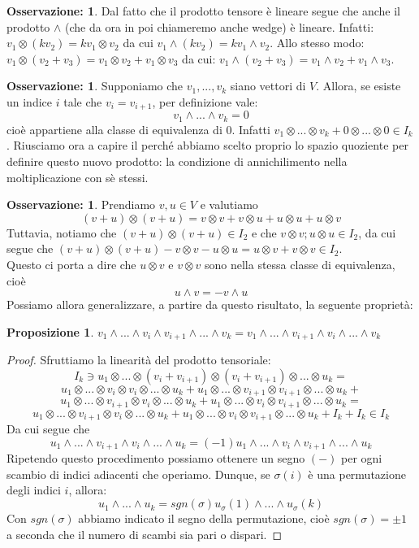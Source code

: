 \documentclass[12pt,a4paper]{report}
\theoremstyle{definition}
\theoremstyle{Theorem}
\newtheorem{Prop}[Def]{Proposizione}
\theoremstyle{definition}
\theoremstyle{definition}
\theoremstyle{definition}
\newtheorem{Obs}[Def]{Osservazione:}
\begin{document}
\begin{Obs}
	Dal fatto che il prodotto tensore è lineare segue che anche il prodotto $\wedge$ (che da ora in poi chiameremo anche wedge) è lineare. Infatti:
	$v_1\otimes (kv_2)=kv_1\otimes v_2$ da cui $v_1\wedge (kv_2)=kv_1\wedge v_2$.
	Allo stesso modo: $v_1\otimes (v_2+v_3)=v_1\otimes v_2+v_1\otimes v_3$ da cui: $v_1\wedge (v_2+v_3)=v_1\wedge v_2+v_1\wedge v_3$.
\end{Obs}
\begin{Obs}
	Supponiamo che $v_1,...,v_k$ siano vettori di $V$. Allora, se esiste un indice $i$ tale che $v_i=v_{i+1}$, per definizione vale:
	$$v_1\wedge...\wedge v_k=0$$ cioè appartiene alla classe di equivalenza di $0$. Infatti $v_1\otimes...\otimes v_k+0\otimes...\otimes 0\in I_k$. Riusciamo ora a capire il perché abbiamo scelto proprio lo spazio quoziente per definire questo nuovo prodotto: la condizione di annichilimento nella moltiplicazione con sè stessi. 
\end{Obs}
\begin{Obs}
	Prendiamo $v,u\in V$ e valutiamo
	$$(v+u)\otimes (v+u)=v\otimes v+v\otimes u + u \otimes u +u\otimes v$$
	Tuttavia, notiamo che $(v+u)\otimes (v+u)\in I_2$ e che $v\otimes v;u \otimes u\in I_2$, da cui segue che $(v+u)\otimes (v+u)-v\otimes v-u \otimes u=u\otimes v+v\otimes v\in I_2$.\\
	Questo ci porta a dire che $u\otimes v$ e $v\otimes v$ sono nella stessa classe di equivalenza, cioè $$u\wedge v=-v\wedge u$$
	Possiamo allora generalizzare, a partire da questo risultato, la seguente proprietà:
\end{Obs}
\begin{Prop}
	$v_1\wedge...\wedge v_i\wedge v_{i+1}\wedge...\wedge v_k=v_1\wedge...\wedge v_{i+1}\wedge v_{i}\wedge...\wedge v_k$
\end{Prop}
\begin{proof}
	Sfruttiamo la linearità del prodotto tensoriale:
	$$I_k\ni u_1\otimes...\otimes (v_i+v_{i+1})\otimes(v_i+v_{i+1})\otimes ...\otimes u_k=$$
	$$u_1\otimes...\otimes v_i\otimes v_i\otimes ...\otimes u_k+u_1\otimes...\otimes  v_{i+1}\otimes v_{i+1}\otimes ...\otimes u_k+$$
	$$
	u_1\otimes...\otimes v_{i+1}\otimes v_i\otimes ...\otimes u_k+u_1\otimes...\otimes  v_{i}\otimes v_{i+1}\otimes ...\otimes u_k=$$
	$$u_1\otimes...\otimes v_{i+1}\otimes v_i\otimes ...\otimes u_k+u_1\otimes...\otimes  v_{i}\otimes v_{i+1}\otimes ...\otimes u_k+I_k+I_k\in I_k$$
	Da cui segue che
	$$u_1\wedge...\wedge v_{i+1}\wedge v_i\wedge ...\wedge u_k=(-1)u_1\wedge...\wedge  v_{i}\wedge v_{i+1}\wedge ...\wedge u_k$$
	Ripetendo questo procedimento possiamo ottenere un segno $(-)$ per ogni scambio di indici adiacenti che operiamo. Dunque, se $\sigma(i)$ è una permutazione degli indici $i$, allora:
	$$u_1\wedge...\wedge u_k=sgn(\sigma)u_\sigma(1)\wedge...\wedge u_\sigma(k)$$
	Con $sgn(\sigma)$ abbiamo indicato il segno della permutazione, cioè $sgn(\sigma)=\pm1$ a seconda che il numero di scambi sia pari o dispari.
\end{proof}
\end{document}
